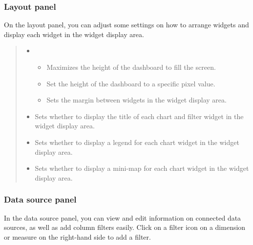 \documentclass[letterpaper,10pt,english]{sphinxmanual}
\begin{document}
\subsubsection{Layout panel}
\label{\detokenize{discovery/part04/change_dashboard_layout_and_size:id5}}
On the layout panel, you can adjust some settings on how to arrange widgets and display each widget in the widget display area.
\begin{quote}

\begin{figure}[H]
\centering

\noindent{}
\end{figure}
\begin{itemize}
\item {} 
\begin{itemize}
\item {} 
 Maximizes the height of the dashboard to fill the screen.

\item {} 
 Set the height of the dashboard to a specific pixel value.

\item {} 
 Sets the margin between widgets in the widget display area.

\end{itemize}

\item {} 
 Sets whether to display the title of each chart and filter widget in the widget display area.

\item {} 
 Sets whether to display a legend for each chart widget in the widget display area.

\item {} 
 Sets whether to display a mini-map for each chart widget in the widget display area.

\end{itemize}
\end{quote}


\subsubsection{Data source panel}
\label{\detokenize{discovery/part04/change_dashboard_layout_and_size:id6}}
In the data source panel, you can view and edit information on connected data sources, as well as add column filters easily. Click on a filter icon on a dimension or measure on the right-hand side to add a filter.
\begin{quote}

\begin{figure}[H]
\centering

\noindent{}
\end{figure}
\end{quote}
\end{document}
